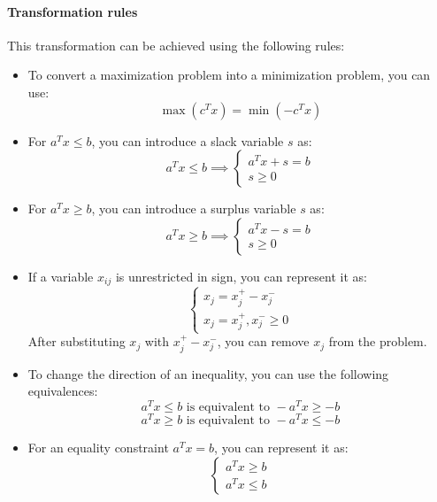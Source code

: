 \paragraph*{Transformation rules}
This transformation can be achieved using the following rules:
\begin{itemize}
    \item To convert a maximization problem into a minimization problem, you can use: 
        \[\max{(c^Tx)}=\min{(-c^Tx)}\]
    \item For $a^Tx \leq b$, you can introduce a slack variable $s$ as: 
        \[a^Tx \leq b \implies
        \begin{cases}
            a^Tx+s=b \\
            s \geq 0
        \end{cases}\]
    \item For $a^Tx \geq b$, you can introduce a surplus variable $s$ as: 
        \[a^Tx \geq b \implies 
        \begin{cases}
            a^Tx-s=b \\
            s \geq 0
        \end{cases}\]
    \item If a variable $x_{ij}$ is unrestricted in sign, you can represent it as:
        \[\begin{cases}
            x_j=x_j^{+}-x_j^{-} \\
            x_j=x_j^{+},x_j^{-} \geq 0
        \end{cases}\]
        After substituting $x_j$ with $x_j^{+}-x_j^{-}$, you can remove $x_j$ from the problem. 
    \item To change the direction of an inequality, you can use the following equivalences:
        \[a^Tx \leq b \text{ is equivalent to } -a^Tx \geq -b\]
        \[a^Tx \geq b \text{ is equivalent to } -a^Tx \leq -b\]
    \item For an equality constraint $a^Tx = b$, you can represent it as:
        \[\begin{cases}
            a^Tx \geq b \\
            a^Tx \leq b
        \end{cases}\]
\end{itemize}
